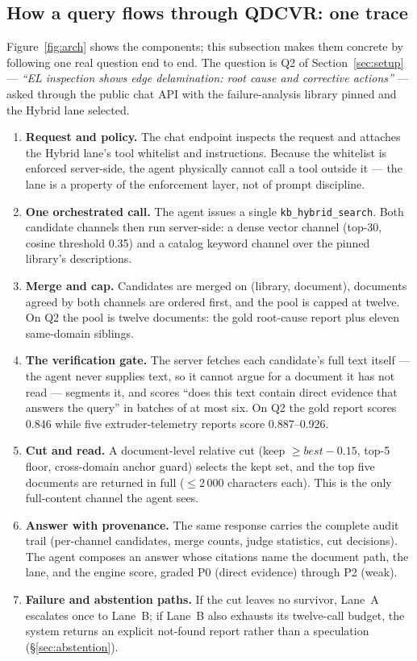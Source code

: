 \documentclass[preprint,12pt]{elsarticle}
\begin{document}
\subsection{How a query flows through QDCVR: one trace}
\label{sec:trace}
Figure~\ref{fig:arch} shows the components; this subsection makes them
concrete by following one real question end to end. The question is Q2 of
Section~\ref{sec:setup} --- \emph{``EL inspection shows edge delamination:
root cause and corrective actions''} --- asked through the public chat API
with the failure-analysis library pinned and the Hybrid lane selected.

\begin{enumerate}
\item \textbf{Request and policy.} The chat endpoint inspects the request and
attaches the Hybrid lane's tool whitelist and instructions. Because the
whitelist is enforced server-side, the agent physically cannot call a tool
outside it --- the lane is a property of the enforcement layer, not of prompt
discipline.
\item \textbf{One orchestrated call.} The agent issues a single
\texttt{kb\_hybrid\_search}. Both candidate channels then run server-side: a
dense vector channel (top-30, cosine threshold 0.35) and a catalog keyword
channel over the pinned library's descriptions.
\item \textbf{Merge and cap.} Candidates are merged on (library, document),
documents agreed by both channels are ordered first, and the pool is capped at
twelve. On Q2 the pool is twelve documents: the gold root-cause report plus
eleven same-domain siblings.
\item \textbf{The verification gate.} The server fetches each candidate's full
text itself --- the agent never supplies text, so it cannot argue for a
document it has not read --- segments it, and scores ``does this text contain
direct evidence that answers the query'' in batches of at most six. On Q2 the
gold report scores 0.846 while five extruder-telemetry reports score
0.887--0.926.
\item \textbf{Cut and read.} A document-level relative cut (keep
$\geq \mathit{best}-0.15$, top-5 floor, cross-domain anchor guard) selects the
kept set, and the top five documents are returned in full ($\leq$2\,000
characters each). This is the only full-content channel the agent sees.
\item \textbf{Answer with provenance.} The same response carries the complete
audit trail (per-channel candidates, merge counts, judge statistics, cut
decisions). The agent composes an answer whose citations name the document
path, the lane, and the engine score, graded P0 (direct evidence) through P2
(weak).
\item \textbf{Failure and abstention paths.} If the cut leaves no survivor,
Lane~A escalates once to Lane~B; if Lane~B also exhausts its twelve-call
budget, the system returns an explicit not-found report rather than a
speculation (\S\ref{sec:abstention}).
\end{enumerate}
\end{document}
